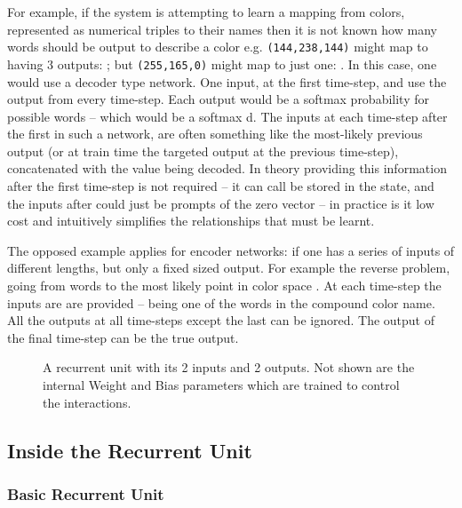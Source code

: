 \documentclass[12pt,parskip]{komatufte}
\begin{document}
For example, if the system is attempting to learn a mapping from colors, represented as numerical triples to their names then it is not known how many words should be output to describe a color e.g. \texttt{(144,238,144)} might map to having 3 outputs: ; but \texttt{(255,165,0)} might map to just one:  .
In this case, one would use a decoder type network.
One input, at the first time-step, and use the output from every time-step.
Each output would be a softmax probability for possible words -- which would be a softmax d.
The inputs at each time-step after the first in such a network, are often something like the most-likely previous output (or at train time the targeted output at the previous time-step), concatenated with the value being decoded.
In theory providing this information after the first time-step is not required -- it can call be stored in the state, and the inputs after could just be prompts of the zero vector -- in practice is it low cost and intuitively simplifies the relationships that must be learnt.

The opposed example applies for encoder networks:
if one has a series of inputs of different lengths,
but only a fixed sized output.
For example the reverse problem, going from words to the most likely point in color space .
At each time-step the inputs are are provided -- being one of the words in the compound color name.
All the outputs at all time-steps except the last can be ignored.
The output of the final time-step can be the true output.



\begin{figure}
	\caption{A recurrent unit with its 2 inputs and 2 outputs. Not shown are the internal Weight and Bias parameters which are trained to control the interactions.}	
	
	\label{fig-ru}
	
	
\end{figure}


\subsection{Inside the Recurrent Unit}


\subsubsection{Basic Recurrent Unit}
\end{document}
